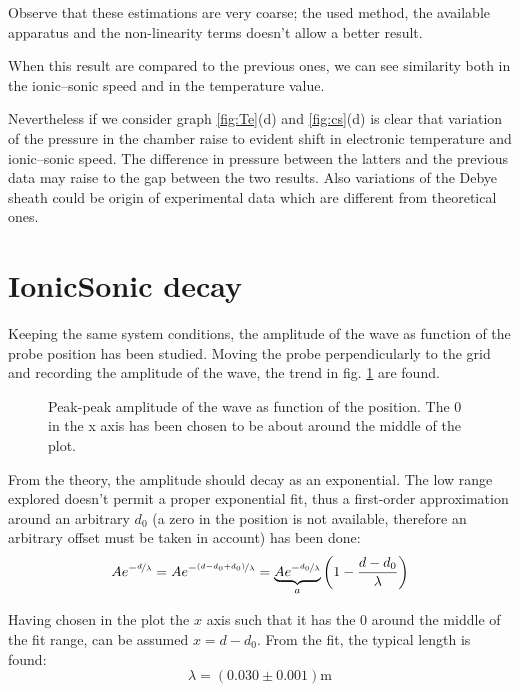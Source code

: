 \documentclass[11pt,a4 paper]{article}
\let\oldfrac\frac
\renewcommand{\frac}[3][d]{\ifthenelse{\equal{#1}{d}}{\oldfrac{#2}{#3}}{\nicefrac{#2}{#3}}}
\begin{document}
Observe that these estimations are very coarse; the used method, the available apparatus and the non-linearity terms doesn't allow a better result.

When this result are compared to the previous ones, we can see similarity both in the ionic--sonic speed and in the temperature value.

Nevertheless if we consider graph \ref{fig:Te}(d) and \ref{fig:cs}(d) is clear that variation of the pressure in the chamber raise to evident shift in electronic temperature and ionic--sonic speed. The difference in pressure between the latters and the previous data may raise to the gap between the two results. Also variations of the Debye sheath could be origin of experimental data which are different from theoretical ones.

\section{IonicSonic decay}
Keeping the same system conditions, the amplitude of the wave as function of the probe position has been studied. Moving the probe perpendicularly to the grid and recording the amplitude of the wave, the trend in fig. \ref{fig:ionicsonic:expdecay} are found.

\begin{figure}[H]
  \centering
  \caption{Peak-peak amplitude of the wave as function of the position. The $0$ in the x axis has been chosen to be about around the middle of the plot.}
  \label{fig:ionicsonic:expdecay}
\end{figure}

From the theory, the amplitude should decay as an exponential. The low range explored doesn't permit a proper exponential fit, thus a first-order approximation around an arbitrary $d_0$ (a zero in the position is not available, therefore an arbitrary offset must be taken in account) has been done:
\begin{equation*}
  Ae^{-\frac[f]{d}{\lambda}} = Ae^{-\frac[f]{(d-d_0+d_0)}{\lambda}} =  \underbrace{Ae^{-\frac[f]{d_0}{\lambda}}}_{a} \left( 1 - \frac{d-d_0}{\lambda}\right)
\end{equation*}

Having chosen in the plot the $x$ axis such that it has the $0$ around the middle of the fit range, can be assumed $x = d-d_0$. From the fit, the typical length is found:
\begin{equation*}
  \lambda = ( 0.030 \pm 0.001 )\si{\metre}
\end{equation*}
\end{document}
